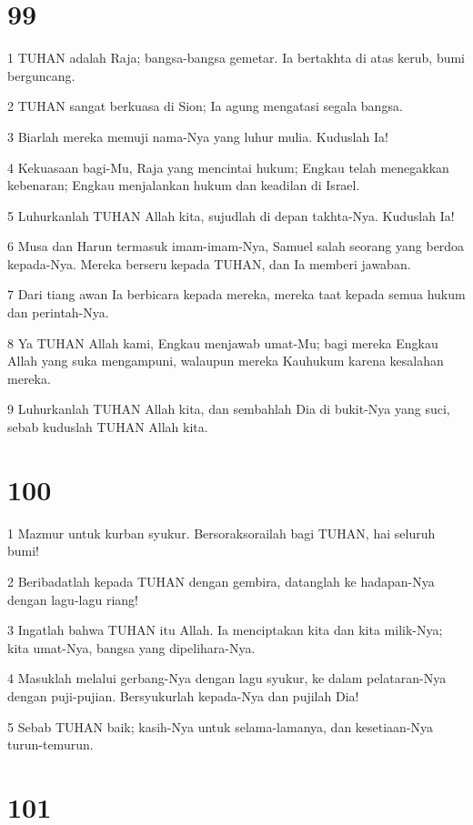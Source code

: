 \chapter{99}

\par 1 TUHAN adalah Raja; bangsa-bangsa gemetar. Ia bertakhta di atas kerub, bumi berguncang.
\par 2 TUHAN sangat berkuasa di Sion; Ia agung mengatasi segala bangsa.
\par 3 Biarlah mereka memuji nama-Nya yang luhur mulia. Kuduslah Ia!
\par 4 Kekuasaan bagi-Mu, Raja yang mencintai hukum; Engkau telah menegakkan kebenaran; Engkau menjalankan hukum dan keadilan di Israel.
\par 5 Luhurkanlah TUHAN Allah kita, sujudlah di depan takhta-Nya. Kuduslah Ia!
\par 6 Musa dan Harun termasuk imam-imam-Nya, Samuel salah seorang yang berdoa kepada-Nya. Mereka berseru kepada TUHAN, dan Ia memberi jawaban.
\par 7 Dari tiang awan Ia berbicara kepada mereka, mereka taat kepada semua hukum dan perintah-Nya.
\par 8 Ya TUHAN Allah kami, Engkau menjawab umat-Mu; bagi mereka Engkau Allah yang suka mengampuni, walaupun mereka Kauhukum karena kesalahan mereka.
\par 9 Luhurkanlah TUHAN Allah kita, dan sembahlah Dia di bukit-Nya yang suci, sebab kuduslah TUHAN Allah kita.

\chapter{100}

\par 1 Mazmur untuk kurban syukur. Bersoraksorailah bagi TUHAN, hai seluruh bumi!
\par 2 Beribadatlah kepada TUHAN dengan gembira, datanglah ke hadapan-Nya dengan lagu-lagu riang!
\par 3 Ingatlah bahwa TUHAN itu Allah. Ia menciptakan kita dan kita milik-Nya; kita umat-Nya, bangsa yang dipelihara-Nya.
\par 4 Masuklah melalui gerbang-Nya dengan lagu syukur, ke dalam pelataran-Nya dengan puji-pujian. Bersyukurlah kepada-Nya dan pujilah Dia!
\par 5 Sebab TUHAN baik; kasih-Nya untuk selama-lamanya, dan kesetiaan-Nya turun-temurun.

\chapter{101}

